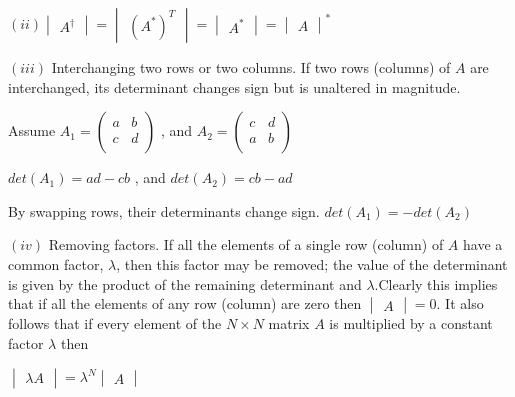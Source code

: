 \documentclass[fleqn]{article}
\begin{document}
\begin{enumerate}
    \bigbreak

    $
    (ii) \begin{vmatrix}
      A^{\dagger}
    \end{vmatrix}=\begin{vmatrix}
      (A^*)^T
    \end{vmatrix}=\begin{vmatrix}
      A^*
    \end{vmatrix}=\begin{vmatrix}
      A
    \end{vmatrix}^*
    $

    \bigbreak

    $(iii)$ Interchanging two rows or two columns. If two rows (columns) of $A$ are interchanged, its determinant changes sign but is unaltered in magnitude.

    \textcolor{hwColor}{
      Assume
      $
      A_1=\begin{pmatrix}
        a & b \\
        c & d \\
      \end{pmatrix}
      $
      , and
      $
      A_2=\begin{pmatrix}
        c & d \\
        a & b \\
      \end{pmatrix}
      $
    }

    \textcolor{hwColor}{
      $
      det(A_1)=ad-cb
      $
      , and
      $
      det(A_2)=cb-ad
      $
    }

    \textcolor{hwColor}{
      By swapping rows, their determinants change sign.  $det(A_1)=-det(A_2)$
    }

    \bigbreak

    $(iv)$ Removing factors. If all the elements of a single row (column) of $A$ have a common factor, $\lambda$, then this factor may be removed;  the value of the determinant is given by the product of the remaining determinant and $\lambda$.Clearly this implies that if all the elements of any row (column) are zero then $\begin{vmatrix}
      A
    \end{vmatrix}=0$. It also follows that if every element of the $N \times N$ matrix $A$ is multiplied by a constant factor $\lambda$ then

    $\begin{vmatrix}
      \lambda A
    \end{vmatrix}= \lambda^N \begin{vmatrix}
      A
    \end{vmatrix}
    $


\end{enumerate}
\end{document}
